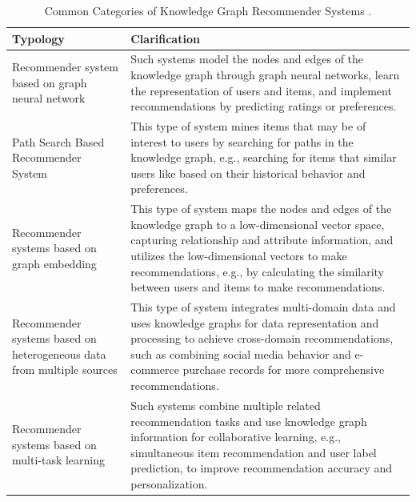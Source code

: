 \begin{table}[h]
\centering
\caption{Common Categories of Knowledge Graph Recommender Systems \parencite{yu2024review}.}
\begin{tabular}{|p{}|p{}|}
\hline
\textbf{Typology} & \textbf{Clarification} \\
\hline
Recommender system based on graph neural network & Such systems model the nodes and edges of the knowledge graph through graph neural networks, learn the representation of users and items, and implement recommendations by predicting ratings or preferences. \\
\hline
Path Search Based Recommender System & This type of system mines items that may be of interest to users by searching for paths in the knowledge graph, e.g., searching for items that similar users like based on their historical behavior and preferences. \\
\hline
Recommender systems based on graph embedding & This type of system maps the nodes and edges of the knowledge graph to a low-dimensional vector space, capturing relationship and attribute information, and utilizes the low-dimensional vectors to make recommendations, e.g., by calculating the similarity between users and items to make recommendations. \\
\hline
Recommender systems based on heterogeneous data from multiple sources & This type of system integrates multi-domain data and uses knowledge graphs for data representation and processing to achieve cross-domain recommendations, such as combining social media behavior and e-commerce purchase records for more comprehensive recommendations. \\
\hline
Recommender systems based on multi-task learning & Such systems combine multiple related recommendation tasks and use knowledge graph information for collaborative learning, e.g., simultaneous item recommendation and user label prediction, to improve recommendation accuracy and personalization. \\
\hline
\end{tabular}
\end{table}
